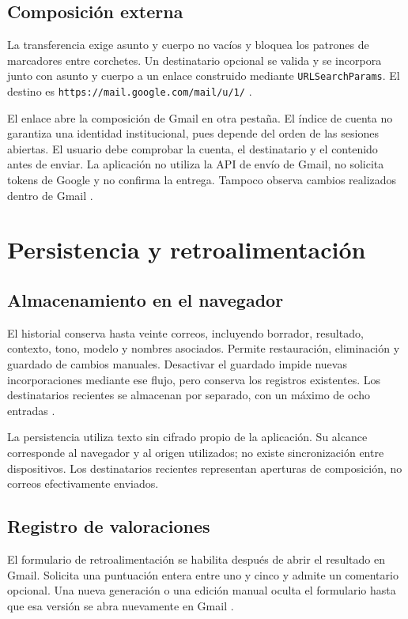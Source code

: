 \documentclass[conference]{IEEEtran}
\begin{document}
\subsection{Composición externa}
La transferencia exige asunto y cuerpo no vacíos y bloquea los patrones de marcadores entre corchetes. Un destinatario opcional se valida y se incorpora junto con asunto y cuerpo a un enlace construido mediante \texttt{URLSearchParams}. El destino es \texttt{https://mail.google.com/mail/u/1/} \cite{gmail}.

El enlace abre la composición de Gmail en otra pestaña. El índice de cuenta no garantiza una identidad institucional, pues depende del orden de las sesiones abiertas. El usuario debe comprobar la cuenta, el destinatario y el contenido antes de enviar. La aplicación no utiliza la API de envío de Gmail, no solicita tokens de Google y no confirma la entrega. Tampoco observa cambios realizados dentro de Gmail \cite{readme,gmail}.

\section{Persistencia y retroalimentación}
\subsection{Almacenamiento en el navegador}
El historial conserva hasta veinte correos, incluyendo borrador, resultado, contexto, tono, modelo y nombres asociados. Permite restauración, eliminación y guardado de cambios manuales. Desactivar el guardado impide nuevas incorporaciones mediante ese flujo, pero conserva los registros existentes. Los destinatarios recientes se almacenan por separado, con un máximo de ocho entradas \cite{app,gmail}.

La persistencia utiliza texto sin cifrado propio de la aplicación. Su alcance corresponde al navegador y al origen utilizados; no existe sincronización entre dispositivos. Los destinatarios recientes representan aperturas de composición, no correos efectivamente enviados.

\subsection{Registro de valoraciones}
El formulario de retroalimentación se habilita después de abrir el resultado en Gmail. Solicita una puntuación entera entre uno y cinco y admite un comentario opcional. Una nueva generación o una edición manual oculta el formulario hasta que esa versión se abra nuevamente en Gmail \cite{app}.
\end{document}
